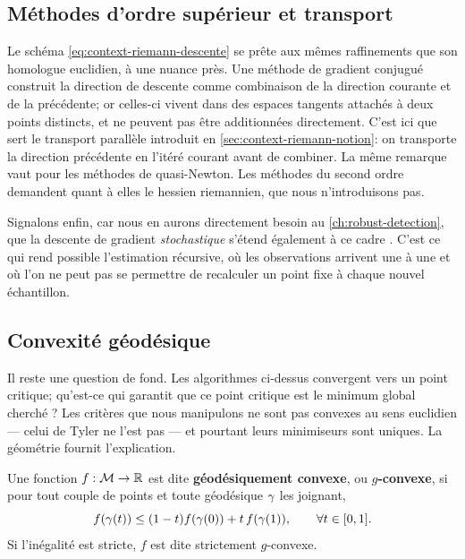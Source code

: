 \subsection{Méthodes d'ordre supérieur et transport}

Le schéma \cref{eq:context-riemann-descente} se prête aux mêmes raffinements que son homologue euclidien, à une nuance près. Une méthode de gradient conjugué construit la direction de descente comme combinaison de la direction courante et de la précédente; or celles-ci vivent dans des espaces tangents attachés à deux points distincts, et ne peuvent pas être additionnées directement. C'est ici que sert le transport parallèle introduit en \cref{sec:context-riemann-notion}: on transporte la direction précédente en l'itéré courant avant de combiner. La même remarque vaut pour les méthodes de quasi-Newton. Les méthodes du second ordre demandent quant à elles le hessien riemannien, que nous n'introduisons pas.

Signalons enfin, car nous en aurons directement besoin au \cref{ch:robust-detection}, que la descente de gradient \emph{stochastique} s'étend également à ce cadre . C'est ce qui rend possible l'estimation récursive, où les observations arrivent une à une et où l'on ne peut pas se permettre de recalculer un point fixe à chaque nouvel échantillon.

\subsection{Convexité géodésique}

Il reste une question de fond. Les algorithmes ci-dessus convergent vers un point critique; qu'est-ce qui garantit que ce point critique est le minimum global cherché ? Les critères que nous manipulons ne sont pas convexes au sens euclidien --- celui de Tyler ne l'est pas --- et pourtant leurs minimiseurs sont uniques. La géométrie fournit l'explication.

\begin{definition}
\label{def:context-riemann-gconvexite}
  Une fonction $f:\mathcal{M}\to\mathbb{R}$ est dite \textbf{géodésiquement convexe}, ou \textbf{$g$-convexe}, si pour tout couple de points et toute géodésique $\gamma$ les joignant,
  \begin{equation}
    f(\gamma(t)) \leq (1-t)f(\gamma(0)) + t\,f(\gamma(1)),
    \qquad \forall t\in[0,1].
    \label{eq:context-riemann-gconvexite}
  \end{equation}
  Si l'inégalité est stricte, $f$ est dite strictement $g$-convexe.
\end{definition}

